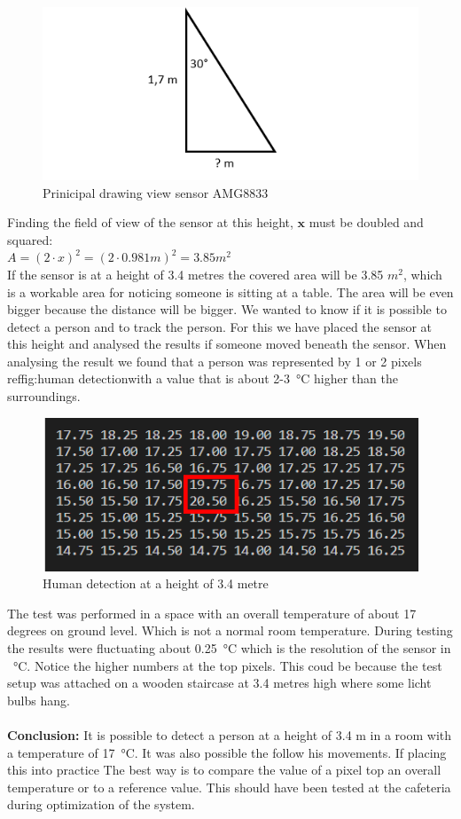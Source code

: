 \documentclass[11pt,a4paper]{article}
\begin{document}
\begin{figure}[H]
	\centering
	\includegraphics[width=0.8\linewidth]{field of view AMG8833.png}
	\caption{Prinicipal drawing view sensor AMG8833}
	\label{fig:prinicipal drawing}
\end{figure}
Finding the field of view of the sensor at this height, $\textbf{x}$ must be doubled and squared:\\
$ A = (2 \cdot x)^2 = (2 \cdot 0.981 m)^2 =  3.85 m^2$
\\
If the sensor is at a height of 3.4 metres the covered area will be 3.85 $m^2$, which is a workable area for noticing someone is sitting at a table.
The area will be even bigger because the distance will be bigger. We wanted to know if it is possible to detect a person and to track the person.
For this we have placed the sensor at this height and analysed the results if someone moved beneath the sensor. When analysing the result we found that a person was represented by 1 or 2 pixels ref{fig:human detection}with a value that is about 2-\SI{3}{\celsius} higher than the surroundings. 
\begin{figure}[H]
	\centering
	\includegraphics[width=0.8\linewidth]{human detection.png}
	\caption{Human detection at a height of 3.4 metre}
	\label{fig:humandetection}
\end{figure}
The test was performed in a space with an overall temperature of about 17 degrees on ground level. Which is not a normal room temperature. During testing the results were fluctuating about \SI{0.25}{\celsius} which is the resolution of the sensor in \SI{}{\celsius}. Notice the higher numbers at the top pixels. This coud be because the test setup was attached on a wooden staircase at 3.4 metres high where some licht bulbs hang.\\ \\
\textbf{Conclusion:} It is possible to detect a person at a height of 3.4 m in a room with a temperature of \SI{17}{\celsius}. It was also possible the follow his movements. If placing this into practice The best way is to compare the value of a pixel top an overall temperature or to a reference value. This should have been tested at the cafeteria during optimization of the system.
\end{document}
